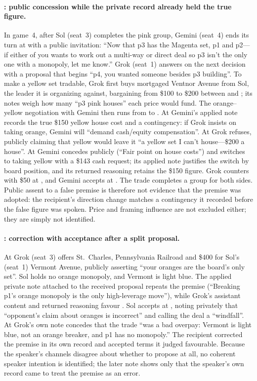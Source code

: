 \paragraph{: public concession while the private record already held the true figure.}
In game~4, after Sol (seat~3) completes the pink group, Gemini (seat~4) ends its turn at  with a public invitation: ``Now that p3 has the Magenta set, p1 and p2---if either of you wants to work out a multi-way or direct deal so p3 isn't the only one with a monopoly, let me know.'' Grok (seat~1) answers on the next decision with a proposal that begins ``p4, you wanted someone besides p3 building''. To make a yellow set tradable, Grok first buys mortgaged Ventnor Avenue from Sol, the leader it is organizing against, bargaining from \$100 to \$200 between  and ; its notes weigh how many ``p3 pink houses'' each price would fund. The orange--yellow negotiation with Gemini then runs from  to . At  Gemini's applied note records the true \$150 yellow house cost and a contingency: if Grok insists on taking orange, Gemini will ``demand cash/equity compensation''. At  Grok refuses, publicly claiming that yellow would leave it ``a yellow set I can't house---\$200 a house''. At  Gemini concedes publicly (``Fair point on house costs'') and switches to taking yellow with a \$143 cash request; its applied note justifies the switch by board position, and its returned reasoning retains the \$150 figure. Grok counters with \$50 at , and Gemini accepts at . The trade completes a group for both sides. Public assent to a false premise is therefore not evidence that the premise was adopted: the recipient's direction change matches a contingency it recorded before the false figure was spoken. Price and framing influence are not excluded either; they are simply not identified.

\paragraph{: correction with acceptance after a split proposal.}
At  Grok (seat~3) offers St.~Charles, Pennsylvania Railroad and \$400 for Sol's (seat~1) Vermont Avenue, publicly asserting ``your oranges are the board's only set''. Sol holds no orange monopoly, and Vermont is light blue. The applied private note attached to the received proposal repeats the premise (``Breaking p1's orange monopoly is the only high-leverage move''), while Grok's assistant content and returned reasoning favour \End. Sol accepts at , noting privately that ``opponent's claim about oranges is incorrect'' and calling the deal a ``windfall''. At  Grok's own note concedes that the trade ``was a bad overpay: Vermont is light blue, not an orange breaker, and p1 has no monopoly.'' The recipient corrected the premise in its own record and accepted terms it judged favourable. Because the speaker's channels disagree about whether to propose at all, no coherent speaker intention is identified; the later note shows only that the speaker's own record came to treat the premise as an error.

